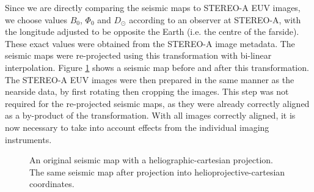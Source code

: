 \documentclass[11pt,a4paper,onecolumn]{report}
\begin{document}
Since we are directly comparing the seismic maps to STEREO-A EUV images, we
choose values \(B_0\), \(\Phi_0\) and \(D_\odot\) according to an observer at
STEREO-A, with the longitude adjusted to be opposite the Earth (i.e. the centre
of the farside). These exact values were obtained from the STEREO-A image
metadata. The seismic maps were re-projected using this transformation with
bi-linear interpolation. Figure \ref{fig:projection} shows a seismic map before
and after this transformation. \\

The STEREO-A EUV images were then prepared in the same manner as the nearside
data, by first rotating then cropping the images. This step was not required for
the re-projected seismic maps, as they were already correctly aligned as a
by-product of the transformation. With all images correctly aligned, it is now
necessary to take into account effects from the individual imaging instruments.

\begin{figure}[t]%
  \centering
  \qquad

  \caption[]{ An original seismic map with a
  heliographic-cartesian projection.  The same
  seismic map after projection into helioprojective-cartesian coordinates.}
  \label{fig:projection}
\end{figure}
\end{document}
